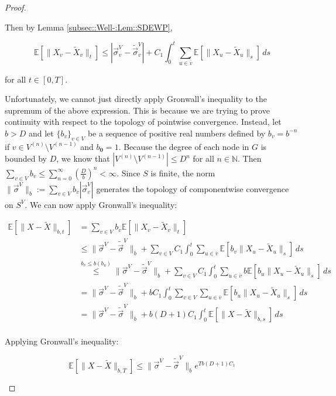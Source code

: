 \documentclass[12pt]{article}
\newcommand{\mb}{\mathbb}
\newcommand{\ov}{\overline}
\newcommand{\os}{\overset}
\newcommand{\ind}{\hspace{24pt}}
\newcommand{\ex}[1]{\mb{E}\left[#1\right]}			%
\renewcommand{\root}{\mathbf{0}}				%
\renewcommand{\v}{v}							%
\newcommand{\vv}{u}								%
\renewcommand{\S}{S}							%
\newcommand{\s}{\sigma}							%
\newcommand{\sv}{\vec{\s}}						%
\renewcommand{\b}{b}							%
\newcommand{\T}{T}								%
\renewcommand{\t}{t}							%
\renewcommand{\tt}{s}							%
\newcommand{\X}{X}								%
\newcommand{\carp}[1]{^{#1}}					%
\newcommand{\vsi}[1]{^{#1}}						%
\newcommand{\cind}[1]{_{#1}}					%
\newcommand{\cl}{\ov}							%
\newcommand{\const}{C}							%
\newcommand{\degr}{D}							%
\newcommand{\sln}[1]{^{(#1)}}					%
\newcommand{\alt}[1]{\widetilde{#1}}			%
\newcommand{\indx}[1]{_{#1}}					%
\begin{document}
\begin{proof}
\begin{enumerate}[(a)]
Then by Lemma \ref{subsec::Well-:Lem::SDEWP},

\[\ex{\|\X\cind{\v} - \alt{\X}\cind{\v}\|_\t} \leq |\sv\cind{\v}\vsi{V} - \alt{\sv}\cind{\v}\vsi{V}| + \const\indx{1}\int_0^\t \sum_{\vv\in \cl{\v}} \ex{\|\X\cind{\vv} - \alt{\X}\cind{\vv}\|_\tt}\,d\tt\]

for all \(\t \in [0,\T]\).

\ind Unfortunately, we cannot just directly apply Gronwall's inequality to the supremum of the above expression. This is because we are trying to prove continuity with respect to the topology of pointwise convergence. Instead, let \(\b > \degr\) and let \(\{\b\cind{\v}\}_{\v \in V}\) be a sequence of positive real numbers defined by \(\b\cind{\v} = \b^{-n}\) if \(\v \in V\sln{n}\setminus V\sln{n-1}\) and \(\b\cind{\root} = 1\). Because the degree of each node in \(G\) is bounded by \(\degr\), we know that \(|V\sln{n}\setminus V\sln{n-1}| \leq \degr^{n}\) for all \(n\in \mb{N}\). Then \(\sum_{\v \in V} \b\cind{\v} \leq \sum_{n=0}^\infty \left(\frac{\degr}{\b}\right)^{n} < \infty\). Since \(\S\) is finite, the norm \(\|\sv\vsi{V}\|_{\b} := \sum_{\v \in V} \b\cind{\v}|\sv\cind{\v}\vsi{V}|\) generates the topology of componentwise convergence on \(\S\carp{V}\). We can now apply Gronwall's inequality:

\begin{align*}
\ex{\|\X - \alt{\X}\|_{\b,\t}} &= \sum_{\v \in V} \b\cind{\v}\ex{\|\X\cind{\v} - \alt{\X}\cind{\v}\|_\t}\\
&\leq \|\sv\vsi{V} - \alt{\sv}\vsi{V}\|_{\b} + \sum_{\v \in V}\const\indx{1}\int_0^\t \sum_{\vv \in \cl{\v}} \ex{\b\cind{\v}\|\X\cind{\vv} - \alt{\X}\cind{\vv}\|_\tt}\,d\tt\\
&\os{\b\cind{\v}\leq \b(\b\cind{\vv})}{\leq} \|\sv\vsi{V} - \alt{\sv}\vsi{V}\|_{\b} + \sum_{\v \in V}\const\indx{1}\int_0^\t \sum_{\vv \in \cl{\v}} \b\ex{\b\cind{\vv}\|\X\cind{\vv} - \alt{\X}\cind{\vv}\|_\tt}\,d\tt\\
&= \|\sv\vsi{V} - \alt{\sv}\vsi{V}\|_{\b} + \b\const\indx{1}\int_0^\t \sum_{\v \in V}\sum_{\vv \in \cl{\v}} \ex{\b\cind{\vv}\|\X\cind{\vv} - \alt{\X}\cind{\vv}\|_\tt}\,d\tt\\
&=\|\sv\vsi{V} - \alt{\sv}\vsi{V}\|_{\b} + \b(\degr+1)\const\indx{1}\int_0^\t \ex{\|\X - \alt{\X}\|_{\b,\tt}}\,d\tt\\
\end{align*}

Applying Gronwall's inequality:

\[\ex{\|\X - \alt{\X}\|_{\b,\T}} \leq \|\sv\vsi{V} - \alt{\sv}\vsi{V}\|_{\b}e^{\T\b(\degr+1)\const\indx{1}}\]


\end{enumerate}
\end{proof}
\end{document}
